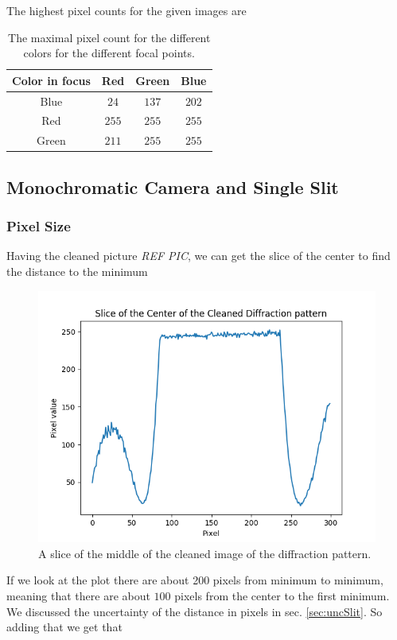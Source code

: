 \documentclass{emulateapj}
\begin{document}
The highest pixel counts for the given images are

\begin{table}[H]
\centering
\begin{tabular}{c | c | c | c}
Color in focus & Red & Green & Blue \\
\hline
Blue & $24$ & $137$ & $202$\\
Red & $255$ & $255$ & $255$\\
Green & $211$ & $255$ & $255$
\end{tabular}
\caption{The maximal pixel count for the different colors for the different focal points.}
\end{table}


\subsection{Monochromatic Camera and Single Slit}


\subsubsection{Pixel Size}

Having the cleaned picture \emph{REF PIC}, we can get the slice of the center to find the distance to the minimum

\begin{figure}[H]
\centering
\includegraphics[scale=0.3]{slice.png}
\caption{A slice of the middle of the cleaned image of the diffraction pattern.}
\label{img:green}
\end{figure}

If we look at the plot there are about 200 pixels from minimum to minimum, meaning that there are about $100$ pixels from the center to the first minimum. We discussed the uncertainty of the distance in pixels in sec. \ref{sec:uncSlit}. So adding that we get that
\end{document}
